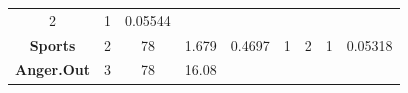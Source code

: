 \documentclass[]{article}
\theoremstyle{definition}
\theoremstyle{definition}
\theoremstyle{definition}
\theoremstyle{remark}
\begin{document}
\begin{longtable}[]{@{}ccccccccc@{}}
\begin{minipage}[t]{0.06\columnwidth}
2\strut
\end{minipage} & \begin{minipage}[t]{0.08\columnwidth}\centering\strut
1\strut
\end{minipage} & \begin{minipage}[t]{0.08\columnwidth}\centering\strut
0.05544\strut
\end{minipage}\tabularnewline
\begin{minipage}[t]{0.22\columnwidth}\centering\strut
\textbf{Sports}\strut
\end{minipage} & \begin{minipage}[t]{0.07\columnwidth}\centering\strut
2\strut
\end{minipage} & \begin{minipage}[t]{0.05\columnwidth}\centering\strut
78\strut
\end{minipage} & \begin{minipage}[t]{0.08\columnwidth}\centering\strut
1.679\strut
\end{minipage} & \begin{minipage}[t]{0.08\columnwidth}\centering\strut
0.4697\strut
\end{minipage} & \begin{minipage}[t]{0.06\columnwidth}\centering\strut
1\strut
\end{minipage} & \begin{minipage}[t]{0.06\columnwidth}\centering\strut
2\strut
\end{minipage} & \begin{minipage}[t]{0.08\columnwidth}\centering\strut
1\strut
\end{minipage} & \begin{minipage}[t]{0.08\columnwidth}\centering\strut
0.05318\strut
\end{minipage}\tabularnewline
\begin{minipage}[t]{0.22\columnwidth}\centering\strut
\textbf{Anger.Out}\strut
\end{minipage} & \begin{minipage}[t]{0.07\columnwidth}\centering\strut
3\strut
\end{minipage} & \begin{minipage}[t]{0.05\columnwidth}\centering\strut
78\strut
\end{minipage} & \begin{minipage}[t]{0.08\columnwidth}\centering\strut
16.08\strut
\end{minipage} & \begin{minipage}[t]{0.08\columnwidth}\centering\strut

\end{minipage}
\end{longtable}
\end{document}
